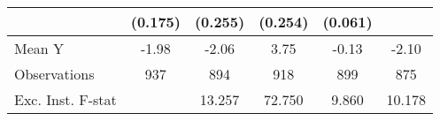 {\begin{tabular}{l*{5}{c}}
            &     (0.175)         &     (0.255)         &     (0.254)         &     (0.061)         &                     \\
\midrule
Mean Y      &       -1.98         &       -2.06         &        3.75         &       -0.13         &       -2.10         \\
Observations&         937         &         894         &         918         &         899         &         875         \\
Exc. Inst. F-stat&                     &      13.257         &      72.750         &       9.860         &      10.178         \\
\bottomrule
\end{tabular}
}
